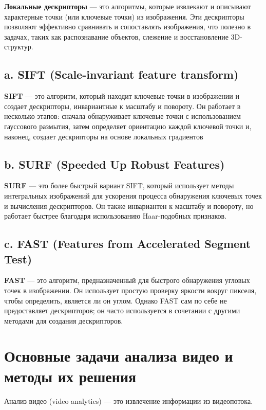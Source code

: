 \documentclass[12pt,a4paper]{article}
\begin{document}
\textbf{Локальные дескрипторы} --- это алгоритмы, которые извлекают и описывают характерные точки (или ключевые точки) из изображения. Эти дескрипторы позволяют эффективно сравнивать и сопоставлять изображения, что полезно в задачах, таких как распознавание объектов, слежение и восстановление 3D-структур.
\subsection*{a. SIFT (Scale-invariant feature transform)}
\textbf{SIFT} — это алгоритм, который находит ключевые точки в изображении и создает дескрипторы, инвариантные к масштабу и повороту. Он работает в несколько этапов: сначала обнаруживает ключевые точки с использованием гауссового размытия, затем определяет ориентацию каждой ключевой точки и, наконец, создает дескрипторы на основе локальных градиентов

\subsection*{b. SURF (Speeded Up Robust Features)}
\textbf{SURF} — это более быстрый вариант SIFT, который использует методы интегральных изображений для ускорения процесса обнаружения ключевых точек и вычисления дескрипторов. Он также инвариантен к масштабу и повороту, но работает быстрее благодаря использованию Haar-подобных признаков.

\subsection*{c. FAST (Features from Accelerated Segment Test)}
\textbf{FAST} — это алгоритм, предназначенный для быстрого обнаружения угловых точек в изображении. Он использует простую проверку яркости вокруг пикселя, чтобы определить, является ли он углом. Однако FAST сам по себе не предоставляет дескрипторов; он часто используется в сочетании с другими методами для создания дескрипторов.

\section{Основные задачи анализа видео и методы их решения}

Анализ видео (video analytics) --- это извлечение информации из видеопотока.
\end{document}
